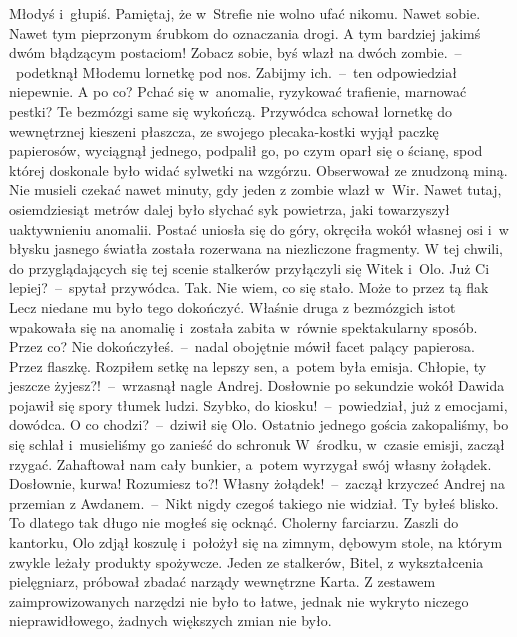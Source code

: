 \documentclass[../MAIN.tex]{subfiles}
\begin{document}
\sd
\xx Młodyś i~głupiś. Pamiętaj, że w~Strefie nie wolno ufać nikomu. Nawet sobie. Nawet tym pieprzonym śrubkom do oznaczania drogi. A tym bardziej jakimś dwóm błądzącym postaciom! Zobacz sobie, byś wlazł na dwóch zombie.~--~podetknął Młodemu lornetkę pod nos.
\xx Zabijmy ich.~--~ten odpowiedział niepewnie.
\xx A po co? Pchać się w~anomalie, ryzykować trafienie, marnować pestki? Te bezmózgi same się wykończą.
\qm
Przywódca schował lornetkę do wewnętrznej kieszeni płaszcza, ze swojego plecaka-kostki wyjął paczkę papierosów, wyciągnął jednego, podpalił go, po czym oparł się o ścianę, spod której doskonale było widać sylwetki na wzgórzu. Obserwował ze znudzoną miną. Nie musieli czekać nawet minuty, gdy jeden z zombie wlazł w~Wir. Nawet tutaj, osiemdziesiąt metrów dalej było
\mm
słychać syk powietrza, jaki towarzyszył uaktywnieniu anomalii. Postać uniosła się do góry, okręciła wokół własnej osi i~w błysku jasnego światła została rozerwana na niezliczone fragmenty. W tej chwili, do przyglądających się tej scenie stalkerów przyłączyli się Witek i~Olo.
\sd
\xx Już Ci lepiej?~--~spytał przywódca.
\xx Tak. Nie wiem, co się stało. Może to przez tą fla\3k
\qm
 Lecz niedane mu było tego dokończyć. Właśnie druga z bezmózgich istot wpakowała się na anomalię i~została zabita w~równie spektakularny sposób.
\sd
\xx Przez co? Nie dokończyłeś.~--~nadal obojętnie mówił facet palący papierosa.
\xx Przez flaszkę. Rozpiłem setkę na lepszy sen, a~potem była emisja.
\xx Chłopie, ty jeszcze żyjesz?!~--~wrzasnął nagle Andrej.
\qm
Dosłownie po sekundzie wokół Dawida pojawił się spory tłumek ludzi.
\sd
\xx Szybko, do kiosku!~--~powiedział, już z emocjami, dowódca.
\xx O co chodzi?~--~dziwił się Olo.
\xx Ostatnio jednego gościa zakopaliśmy, bo się schlał i~musieliśmy go zanieść do schronu\3k W~środku, w~czasie emisji, zaczął rzygać. Zahaftował nam cały bunkier, a~potem wyrzygał swój własny żołądek. Dosłownie, kurwa! Rozumiesz to?! Własny żołądek!~--~zaczął krzyczeć Andrej na przemian z Awdanem.~--~Nikt nigdy czegoś takiego nie widział. Ty byłeś blisko. To dlatego tak długo nie mogłeś się ocknąć. Cholerny farciarzu.
\qm
 Zaszli do kantorku, Olo zdjął koszulę i~położył się na zimnym, dębowym stole, na którym zwykle leżały produkty spożywcze. Jeden ze stalkerów, Bitel, z wykształcenia pielęgniarz, próbował zbadać narządy wewnętrzne Karta. Z zestawem zaimprowizowanych narzędzi nie było to łatwe, jednak nie wykryto niczego nieprawidłowego, żadnych większych zmian nie było.
\end{document}
